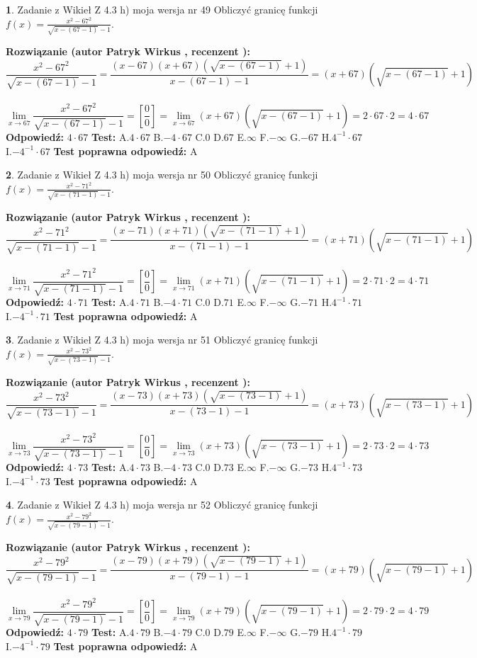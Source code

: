 \documentclass[12pt, a4paper]{article}
\theoremstyle{definition} %
\newtheorem{zad}{}
\newcommand{\zadStart}[1]{\begin{zad}#1\newline}
\newcommand{\zadStop}{\end{zad}}
\newcommand{\rozwStart}[2]{\noindent \textbf{Rozwiązanie (autor #1 , recenzent #2): }\newline}
\newcommand{\rozwStop}{\newline}
\newcommand{\odpStart}{\noindent \textbf{Odpowiedź:}\newline}
\newcommand{\odpStop}{\newline}
\newcommand{\testStart}{\noindent \textbf{Test:}\newline}
\newcommand{\testStop}{\newline}
\newcommand{\kluczStart}{\noindent \textbf{Test poprawna odpowiedź:}\newline}
\newcommand{\kluczStop}{\newline}
\begin{document}
\zadStart{Zadanie z Wikieł Z 4.3 h) moja wersja nr 49}
Obliczyć granicę funkcji $f(x)=\frac{x^{2} - 67^{2}}{\sqrt{x-(67-1)}-1}$.
\zadStop
\rozwStart{Patryk Wirkus}{}
$$\frac{x^{2} - 67^{2}}{\sqrt{x-(67-1)}-1}=\frac{(x-67)(x+67)(\sqrt{x-(67-1)}+1)}{x-(67-1)-1}=(x+67)(\sqrt{x-(67-1)}+1)$$
\\
$$\lim\limits_{x\to 67}\frac{x^{2} - 67^{2}}{\sqrt{x-(67-1)}-1}=[\frac{0}{0}]=
\lim\limits_{x\to 67}(x+67)(\sqrt{x-(67-1)}+1) = 2\cdot67 \cdot 2 = 4 \cdot 67$$
\rozwStop
\odpStart
$4\cdot67$
\odpStop
\testStart
A.$4\cdot67$
B.$-4\cdot67$
C.$0$
D.$67$
E.$\infty$
F.$-\infty$
G.$-67$
H.$4^{-1}\cdot67$
I.$-4^{-1}\cdot67$
\testStop
\kluczStart
A
\kluczStop



\zadStart{Zadanie z Wikieł Z 4.3 h) moja wersja nr 50}
Obliczyć granicę funkcji $f(x)=\frac{x^{2} - 71^{2}}{\sqrt{x-(71-1)}-1}$.
\zadStop
\rozwStart{Patryk Wirkus}{}
$$\frac{x^{2} - 71^{2}}{\sqrt{x-(71-1)}-1}=\frac{(x-71)(x+71)(\sqrt{x-(71-1)}+1)}{x-(71-1)-1}=(x+71)(\sqrt{x-(71-1)}+1)$$
\\
$$\lim\limits_{x\to 71}\frac{x^{2} - 71^{2}}{\sqrt{x-(71-1)}-1}=[\frac{0}{0}]=
\lim\limits_{x\to 71}(x+71)(\sqrt{x-(71-1)}+1) = 2\cdot71 \cdot 2 = 4 \cdot 71$$
\rozwStop
\odpStart
$4\cdot71$
\odpStop
\testStart
A.$4\cdot71$
B.$-4\cdot71$
C.$0$
D.$71$
E.$\infty$
F.$-\infty$
G.$-71$
H.$4^{-1}\cdot71$
I.$-4^{-1}\cdot71$
\testStop
\kluczStart
A
\kluczStop



\zadStart{Zadanie z Wikieł Z 4.3 h) moja wersja nr 51}
Obliczyć granicę funkcji $f(x)=\frac{x^{2} - 73^{2}}{\sqrt{x-(73-1)}-1}$.
\zadStop
\rozwStart{Patryk Wirkus}{}
$$\frac{x^{2} - 73^{2}}{\sqrt{x-(73-1)}-1}=\frac{(x-73)(x+73)(\sqrt{x-(73-1)}+1)}{x-(73-1)-1}=(x+73)(\sqrt{x-(73-1)}+1)$$
\\
$$\lim\limits_{x\to 73}\frac{x^{2} - 73^{2}}{\sqrt{x-(73-1)}-1}=[\frac{0}{0}]=
\lim\limits_{x\to 73}(x+73)(\sqrt{x-(73-1)}+1) = 2\cdot73 \cdot 2 = 4 \cdot 73$$
\rozwStop
\odpStart
$4\cdot73$
\odpStop
\testStart
A.$4\cdot73$
B.$-4\cdot73$
C.$0$
D.$73$
E.$\infty$
F.$-\infty$
G.$-73$
H.$4^{-1}\cdot73$
I.$-4^{-1}\cdot73$
\testStop
\kluczStart
A
\kluczStop



\zadStart{Zadanie z Wikieł Z 4.3 h) moja wersja nr 52}
Obliczyć granicę funkcji $f(x)=\frac{x^{2} - 79^{2}}{\sqrt{x-(79-1)}-1}$.
\zadStop
\rozwStart{Patryk Wirkus}{}
$$\frac{x^{2} - 79^{2}}{\sqrt{x-(79-1)}-1}=\frac{(x-79)(x+79)(\sqrt{x-(79-1)}+1)}{x-(79-1)-1}=(x+79)(\sqrt{x-(79-1)}+1)$$
\\
$$\lim\limits_{x\to 79}\frac{x^{2} - 79^{2}}{\sqrt{x-(79-1)}-1}=[\frac{0}{0}]=
\lim\limits_{x\to 79}(x+79)(\sqrt{x-(79-1)}+1) = 2\cdot79 \cdot 2 = 4 \cdot 79$$
\rozwStop
\odpStart
$4\cdot79$
\odpStop
\testStart
A.$4\cdot79$
B.$-4\cdot79$
C.$0$
D.$79$
E.$\infty$
F.$-\infty$
G.$-79$
H.$4^{-1}\cdot79$
I.$-4^{-1}\cdot79$
\testStop
\kluczStart
A
\kluczStop
\end{document}
